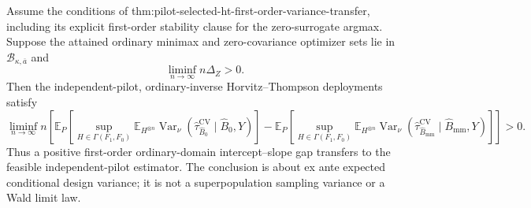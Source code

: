 Assume the conditions of thm:pilot-selected-ht-first-order-variance-transfer, including its explicit first-order stability clause for the zero-surrogate argmax.  Suppose the attained ordinary minimax and zero-covariance optimizer sets lie in \(\mathcal B_{\kappa,\overline a}\) and
\[
\liminf_{n\to\infty}n\Delta_Z>0.
\]
Then the independent-pilot, ordinary-inverse Horvitz--Thompson deployments satisfy
\[
\liminf_{n\to\infty}n\left[
\mathbb E_P\left[
\sup_{H\in\Gamma(F_1,F_0)}
\mathbb E_{H^{\otimes n}}
\operatorname{Var}_\nu
(\widehat\tau_{\widehat B_0}^{\mathrm{CV}}\mid\widehat B_0,Y)
\right]
-
\mathbb E_P\left[
\sup_{H\in\Gamma(F_1,F_0)}
\mathbb E_{H^{\otimes n}}
\operatorname{Var}_\nu
(\widehat\tau_{\widehat B_{\mathrm{mm}}}^{\mathrm{CV}}\mid\widehat B_{\mathrm{mm}},Y)
\right]
\right]>0.
\]
Thus a positive first-order ordinary-domain intercept--slope gap transfers to the feasible independent-pilot estimator.  The conclusion is about ex ante expected conditional design variance; it is not a superpopulation sampling variance or a Wald limit law.